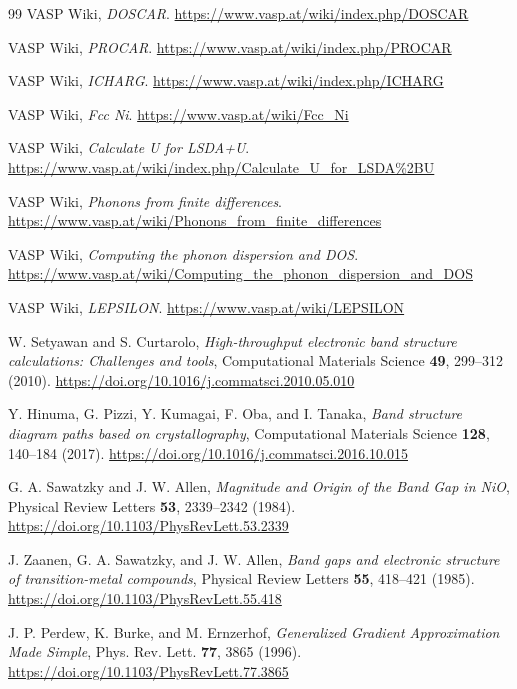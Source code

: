 \documentclass[12pt,a4paper]{article}
\begin{document}
\begin{thebibliography}{99}
VASP Wiki, \emph{DOSCAR}.
\url{https://www.vasp.at/wiki/index.php/DOSCAR}

VASP Wiki, \emph{PROCAR}.
\url{https://www.vasp.at/wiki/index.php/PROCAR}

VASP Wiki, \emph{ICHARG}.
\url{https://www.vasp.at/wiki/index.php/ICHARG}

VASP Wiki, \emph{Fcc Ni}.
\url{https://www.vasp.at/wiki/Fcc_Ni}

VASP Wiki, \emph{Calculate U for LSDA+U}.
\url{https://www.vasp.at/wiki/index.php/Calculate_U_for_LSDA%2BU}

VASP Wiki, \emph{Phonons from finite differences}.
\url{https://www.vasp.at/wiki/Phonons_from_finite_differences}

VASP Wiki, \emph{Computing the phonon dispersion and DOS}.
\url{https://www.vasp.at/wiki/Computing_the_phonon_dispersion_and_DOS}

VASP Wiki, \emph{LEPSILON}.
\url{https://www.vasp.at/wiki/LEPSILON}

W. Setyawan and S. Curtarolo,
\emph{High-throughput electronic band structure calculations: Challenges and tools},
Computational Materials Science \textbf{49}, 299--312 (2010).
\url{https://doi.org/10.1016/j.commatsci.2010.05.010}

Y. Hinuma, G. Pizzi, Y. Kumagai, F. Oba, and I. Tanaka,
\emph{Band structure diagram paths based on crystallography},
Computational Materials Science \textbf{128}, 140--184 (2017).
\url{https://doi.org/10.1016/j.commatsci.2016.10.015}

G. A. Sawatzky and J. W. Allen,
\emph{Magnitude and Origin of the Band Gap in NiO},
Physical Review Letters \textbf{53}, 2339--2342 (1984).
\url{https://doi.org/10.1103/PhysRevLett.53.2339}

J. Zaanen, G. A. Sawatzky, and J. W. Allen,
\emph{Band gaps and electronic structure of transition-metal compounds},
Physical Review Letters \textbf{55}, 418--421 (1985).
\url{https://doi.org/10.1103/PhysRevLett.55.418}

J. P. Perdew, K. Burke, and M. Ernzerhof,
\emph{Generalized Gradient Approximation Made Simple},
Phys. Rev. Lett. \textbf{77}, 3865 (1996).
\url{https://doi.org/10.1103/PhysRevLett.77.3865}


\end{thebibliography}
\end{document}

